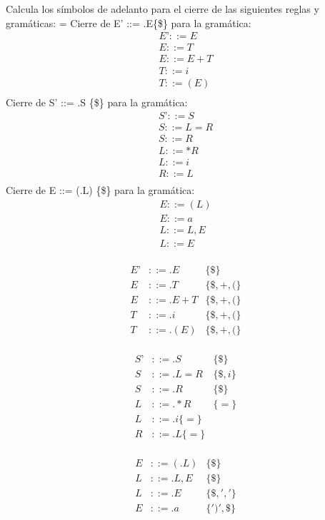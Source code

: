 \documentclass[nochap]{apuntes}
\begin{document}
\begin{problem}[7]
Calcula los símbolos de adelanto para el cierre de las siguientes reglas y gramáticas:
\ppart = Cierre de E’ ::= .E\{\$\} para la gramática:
\begin{gather*}
E’ ::= E\\
E ::= T\\
E ::= E+T\\
T ::= i\\
T ::= (E)\\
\end{gather*}
\ppart Cierre de S’ ::= .S \{\$\} para la gramática:
\begin{gather*}
S’ ::= S\\
S ::= L=R\\
S ::= R\\
L ::= *R\\
L ::= i\\
R ::= L\\
\end{gather*}
\ppart Cierre de E ::= (.L) \{\$\} para la gramática:
\begin{gather*}
E ::= (L)\\
E ::= a\\
L ::= L,E\\
L ::= E\\
\end{gather*}
\solution


\spart
\begin{align*}
E’ &::= .E&\{\$\}\\
E &::= .T &\{\$,+,( \}\\
E &::= .E+T &\{\$,+,(\}\\
T &::= .i &\{\$,+,(\}\\
T &::= .(E)&\{\$,+,(\}\\
\end{align*}

\spart


\begin{align*}
S’ &::= .S&\{\$\}\\
S &::= .L=R &\{\$,i\}\\
S &::= .R&\{\$\}\\
L &::= .*R &\{=\}\\
L &::= .i \{=\} \\
R &::= .L \{=\} \\
\end{align*}


\spart

\begin{align*}
E &::= (.L) &\{\$\}\\
L &::= .L,E &\{\$\}\\
L &::= .E&\{\$,','\}\\
E &::= .a&\{')',\$ \}  \\
\end{align*}
\end{problem}
\end{document}
